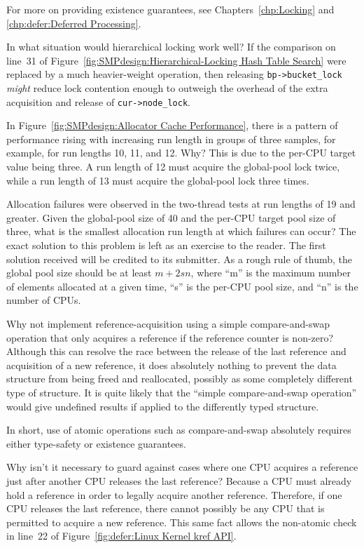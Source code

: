 	For more on providing existence guarantees, see
	Chapters~\ref{chp:Locking} and \ref{chp:defer:Deferred Processing}.

\QuickQ{}
	In what situation would hierarchical locking work well?
\QuickA{}
	If the comparison on line~31 of
	Figure~\ref{fig:SMPdesign:Hierarchical-Locking Hash Table Search}
	were replaced by a much heavier-weight operation,
	then releasing {\tt bp->bucket\_lock} \emph{might} reduce lock
	contention enough to outweigh the overhead of the extra
	acquisition and release of {\tt cur->node\_lock}.

\QuickQ{}
	In Figure~\ref{fig:SMPdesign:Allocator Cache Performance},
	there is a pattern of performance rising with increasing run
	length in groups of three samples, for example, for run lengths
	10, 11, and 12.
	Why?
\QuickA{}
	This is due to the per-CPU target value being three.
	A run length of 12 must acquire the global-pool lock twice,
	while a run length of 13 must acquire the global-pool lock
	three times.

\QuickQ{}
	Allocation failures were observed in the two-thread
	tests at run lengths of 19 and greater.
	Given the global-pool size of 40 and the per-CPU target
	pool size of three, what is the smallest allocation run
	length at which failures can occur?
\QuickA{}
	The exact solution to this problem is left as an exercise to
	the reader.
	The first solution received will be credited to its submitter.
	As a rough rule of thumb, the global pool size should be at least
	$m+2sn$, where
	``m'' is the maximum number of elements allocated at a given time,
	``s'' is the per-CPU pool size,
	and ``n'' is the number of CPUs.

\QuickQ{}
	Why not implement reference-acquisition using
	a simple compare-and-swap operation that only
	acquires a reference if the reference counter is
	non-zero?
\QuickA{}
	Although this can resolve the race between the release of
	the last reference and acquisition of a new reference,
	it does absolutely nothing to prevent the data structure
	from being freed and reallocated, possibly as some completely
	different type of structure.
	It is quite likely that the ``simple compare-and-swap
	operation'' would give undefined results if applied to the
	differently typed structure.

	In short, use of atomic operations such as compare-and-swap
	absolutely requires either type-safety or existence guarantees.

\QuickQ{}
	Why isn't it necessary to guard against cases where one CPU
	acquires a reference just after another CPU releases the last
	reference?
\QuickA{}
	Because a CPU must already hold a reference in order
	to legally acquire another reference.
	Therefore, if one CPU releases the last reference,
	there cannot possibly be any CPU that is permitted
	to acquire a new reference.
	This same fact allows the non-atomic check in line~22
	of Figure~\ref{fig:defer:Linux Kernel kref API}.

